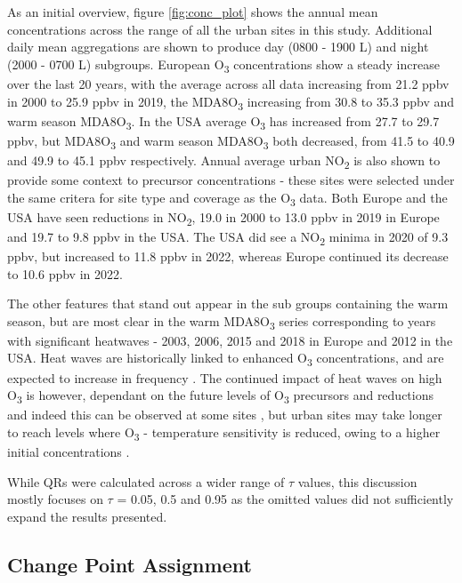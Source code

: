 \documentclass[journal abbreviation, manuscript]{copernicus}
\begin{document}
As an initial overview, figure \ref{fig:conc_plot} shows the annual mean concentrations across the range of all the urban sites in this study. Additional daily mean aggregations are shown to produce day (0800 - 1900 L) and night (2000 - 0700 L) subgroups. European O\textsubscript{3} concentrations show a steady increase over the last 20 years, with the average across all data increasing from 21.2 ppbv in 2000 to 25.9 ppbv in 2019, the MDA8O\textsubscript{3} increasing from 30.8 to 35.3 ppbv and warm season MDA8O\textsubscript{3}. In the USA average O\textsubscript{3} has increased from 27.7 to 29.7 ppbv, but MDA8O\textsubscript{3} and warm season MDA8O\textsubscript{3} both decreased, from 41.5 to 40.9 and 49.9 to 45.1 ppbv respectively. Annual average urban NO\textsubscript{2} is also shown to provide some context to precursor concentrations - these sites were selected under the same critera for site type and coverage as the O\textsubscript{3} data. Both Europe and the USA have seen reductions in NO\textsubscript{2}, 19.0 in 2000 to 13.0 ppbv in 2019 in Europe and 19.7 to 9.8 ppbv in the USA. The USA did see a NO\textsubscript{2} minima in 2020 of 9.3 ppbv, but increased to 11.8 ppbv in 2022, whereas Europe continued its decrease to 10.6 ppbv in 2022. 

The other features that stand out appear in the sub groups containing the warm season, but are most clear in the warm MDA8O\textsubscript{3} series corresponding to years with significant heatwaves - 2003, 2006, 2015 and 2018 in Europe and 2012 in the USA. Heat waves are historically linked to enhanced O\textsubscript{3} concentrations, and are expected to increase in frequency \citep{Schär2004, Russo_2015, https://doi.org/10.1002/2016GL068432, Otero_2016, GOULDSBROUGH2022118975}. The continued impact of heat waves on high O\textsubscript{3} is however, dependant on the future levels of O\textsubscript{3} precursors and reductions and indeed this can be observed at some sites \citep{Meehl_2018, OTERO2021118334, acp-25-2725-2025, acp-25-5101-2025}, but urban sites may take longer to reach levels where O\textsubscript{3} - temperature sensitivity is reduced, owing to a higher initial concentrations \citep{VazquezSantiago2024}. 

While QRs were calculated across a wider range of $\tau$ values, this discussion mostly focuses on $\tau$ = 0.05, 0.5 and 0.95 as the omitted values did not sufficiently expand the results presented.

\subsection{Change Point Assignment} \label{sect:new_mda8_piecewise_types}
\end{document}

